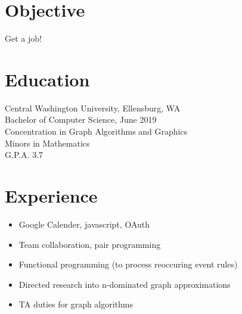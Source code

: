 \documentclass[10pt, a4paper]{article}
\begin{document}

\section*{Objective}
\vspace{-0.05in}
\hspace*{0.1in}
\begin{minipage}{.8\textwidth}
  Get a job!
\end{minipage}
\vspace{-10pt}

\section*{Education}
\vspace{-0.05in}
\hspace*{0.1in}
\begin{minipage}{.8\textwidth}
  Central Washington University, Ellensburg, WA \\
  Bachelor of Computer Science, June 2019 \\
  Concentration in Graph Algorithms and Graphics \\
  Minors in Mathematics \\
  G.P.A. 3.7
\end{minipage}
\vspace{-10pt}

\section*{Experience}

\noindent
{
  \hfill
  \hfill
}
\vspace{-0.1in}
\begin{itemize}
  \item Google Calender, javascript, OAuth
        \vspace{-0.1in}
  \item Team collaboration, pair programming
        \vspace{-0.1in}
  \item Functional programming (to process reoccuring event rules)
        \vspace{-0.05in}
\end{itemize}

\noindent
{
  \hfill
  \hfill
}
\vspace{-0.1in}
\begin{itemize}
  \item Directed research into n-dominated graph approximations
        \vspace{-0.1in}
  \item TA duties for graph algorithms
        \vspace{-0.1in}
\end{itemize}
\end{document}
